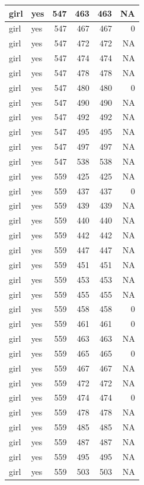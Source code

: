 \documentclass[man]{apa6}
\begin{document}
\begin{tabular}{l|l|r|r|r|r}
\hline
girl & yes & 547 & 463 & 463 & NA\\
\hline
girl & yes & 547 & 467 & 467 & 0\\
\hline
girl & yes & 547 & 472 & 472 & NA\\
\hline
girl & yes & 547 & 474 & 474 & NA\\
\hline
girl & yes & 547 & 478 & 478 & NA\\
\hline
girl & yes & 547 & 480 & 480 & 0\\
\hline
girl & yes & 547 & 490 & 490 & NA\\
\hline
girl & yes & 547 & 492 & 492 & NA\\
\hline
girl & yes & 547 & 495 & 495 & NA\\
\hline
girl & yes & 547 & 497 & 497 & NA\\
\hline
girl & yes & 547 & 538 & 538 & NA\\
\hline
girl & yes & 559 & 425 & 425 & NA\\
\hline
girl & yes & 559 & 437 & 437 & 0\\
\hline
girl & yes & 559 & 439 & 439 & NA\\
\hline
girl & yes & 559 & 440 & 440 & NA\\
\hline
girl & yes & 559 & 442 & 442 & NA\\
\hline
girl & yes & 559 & 447 & 447 & NA\\
\hline
girl & yes & 559 & 451 & 451 & NA\\
\hline
girl & yes & 559 & 453 & 453 & NA\\
\hline
girl & yes & 559 & 455 & 455 & NA\\
\hline
girl & yes & 559 & 458 & 458 & 0\\
\hline
girl & yes & 559 & 461 & 461 & 0\\
\hline
girl & yes & 559 & 463 & 463 & NA\\
\hline
girl & yes & 559 & 465 & 465 & 0\\
\hline
girl & yes & 559 & 467 & 467 & NA\\
\hline
girl & yes & 559 & 472 & 472 & NA\\
\hline
girl & yes & 559 & 474 & 474 & 0\\
\hline
girl & yes & 559 & 478 & 478 & NA\\
\hline
girl & yes & 559 & 485 & 485 & NA\\
\hline
girl & yes & 559 & 487 & 487 & NA\\
\hline
girl & yes & 559 & 495 & 495 & NA\\
\hline
girl & yes & 559 & 503 & 503 & NA\\

\end{tabular}
\end{document}
